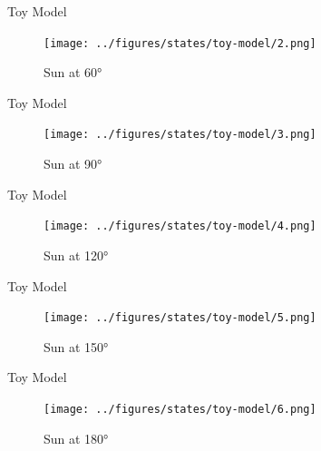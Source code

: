 \documentclass[10pt, xcolor={dvipsnames}]{beamer}
\begin{document}
\begin{frame}{Toy Model}
\begin{center}
\begin{figure}
\texttt{[image: ../figures/states/toy-model/2.png]}
\caption{Sun at 60°}
\end{figure}
\end{center}
\end{frame}

\begin{frame}{Toy Model}
\begin{center}
\begin{figure}
\texttt{[image: ../figures/states/toy-model/3.png]}
\caption{Sun at 90°}
\end{figure}
\end{center}
\end{frame}

\begin{frame}{Toy Model}
\begin{center}
\begin{figure}
\texttt{[image: ../figures/states/toy-model/4.png]}
\caption{Sun at 120°}
\end{figure}
\end{center}
\end{frame}

\begin{frame}{Toy Model}
\begin{center}
\begin{figure}
\texttt{[image: ../figures/states/toy-model/5.png]}
\caption{Sun at 150°}
\end{figure}
\end{center}
\end{frame}

\begin{frame}{Toy Model}
\begin{center}
\begin{figure}
\texttt{[image: ../figures/states/toy-model/6.png]}
\caption{Sun at 180°}
\end{figure}
\end{center}
\end{frame}
\end{document}
